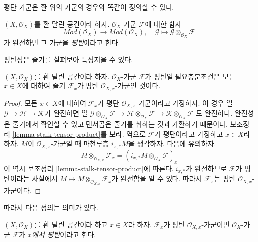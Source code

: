 \noindent
평탄 가군은 환 위의 가군의 경우와 똑같이 정의할 수 있다.

\begin{definition}
\label{definition-flat}
$(X, \mathcal{O}_X)$를 환 달린 공간이라 하자.
$\mathcal{O}_X$-가군 $\mathcal{F}$에 대한 함자
$$
\textit{Mod}(\mathcal{O}_X)
\longrightarrow
\textit{Mod}(\mathcal{O}_X), \quad
\mathcal{G} \mapsto \mathcal{G} \otimes_{\mathcal{O}_X} \mathcal{F}
$$
가 완전하면 그 가군을 {\it 평탄}이라고 한다.
\end{definition}

\noindent
평탄성은 줄기를 살펴보아 특징지을 수 있다.

\begin{lemma}
\label{lemma-flat-stalks-flat}
$(X, \mathcal{O}_X)$를 환 달린 공간이라 하자.
$\mathcal{O}_X$-가군 $\mathcal{F}$가 평탄일 필요충분조건은
모든 $x \in X$에 대하여 줄기 $\mathcal{F}_x$가 평탄
$\mathcal{O}_{X, x}$-가군인 것이다.
\end{lemma}

\begin{proof}
모든 $x \in X$에 대하여 $\mathcal{F}_x$가 평탄
$\mathcal{O}_{X, x}$-가군이라고 가정하자. 이 경우 열
$\mathcal{G} \to \mathcal{H} \to \mathcal{K}$가 완전하면 열
$\mathcal{G} \otimes_{\mathcal{O}_X} \mathcal{F} \to
\mathcal{H} \otimes_{\mathcal{O}_X} \mathcal{F} \to
\mathcal{K} \otimes_{\mathcal{O}_X} \mathcal{F}$
도 완전하다. 완전성은 줄기에서 확인할 수 있고 텐서곱은 줄기를 취하는 것과
가환하기 때문이다. 보조정리 \ref{lemma-stalk-tensor-product}를 보라.
역으로 $\mathcal{F}$가 평탄이라고 가정하고 $x \in X$라 하자.
$M$이 $\mathcal{O}_{X, x}$-가군일 때 마천루층 $i_{x, *} M$을 생각하자.
다음에 유의하자.
$$
M \otimes_{\mathcal{O}_{X, x}} \mathcal{F}_x =
\left(i_{x, *} M \otimes_{\mathcal{O}_X} \mathcal{F}\right)_x
$$
이 역시 보조정리 \ref{lemma-stalk-tensor-product}에 따른다.
$i_{x, *}$가 완전하므로 $\mathcal{F}$가 평탄이라는 사실에서
$M \mapsto M \otimes_{\mathcal{O}_{X, x}} \mathcal{F}_x$가 완전함을 알 수 있다.
따라서 $\mathcal{F}_x$는 평탄 $\mathcal{O}_{X, x}$-가군이다.
\end{proof}

\noindent
따라서 다음 정의는 의미가 있다.

\begin{definition}
\label{definition-flat-at-point}
$(X, \mathcal{O}_X)$를 환 달린 공간이라 하고 $x \in X$라 하자.
$\mathcal{F}_x$가 평탄 $\mathcal{O}_{X, x}$-가군이면
$\mathcal{O}_X$-가군 $\mathcal{F}$가 {\it $x$에서 평탄}이라고 한다.
\end{definition}

